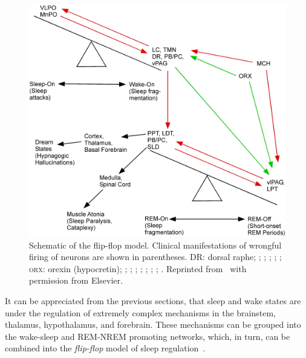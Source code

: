             \begin{figure}
                \includegraphics[width=\textwidth]{figures/clinical-background/SleepStateSwitching/Figure5.png}
                \caption[Schematic of the flip-flop model]{Schematic of the flip-flop model. Clinical manifestations of wrongful firing of neurons are shown in parentheses. %
                {\scriptsize{DR}}: dorsal raphe; %
                ; %
                ; %
                ; %
                ; %
                ; %
                \textsc{orx}: orexin (hypocretin); %
                ; %
                ; %
                ; %
                ; %
                ; %
                ; %
                ; %
                . %
                Reprinted from~\cite{Saper2010} with permission from Elsevier.}
                \label{fig:clinical-background:flipflop}
            \end{figure}
            
            It can be appreciated from the previous sections, that sleep and wake states are under the regulation of extremely complex mechanisms in the brainstem, thalamus, hypothalamus, and forebrain.
            These mechanisms can be grouped into the wake-sleep and \ac{REM}-\ac{NREM} promoting networks, which, in turn, can be combined into the \textit{flip-flop} model of sleep regulation~\cite{Saper2001, Saper2005, Saper2010}.
            

